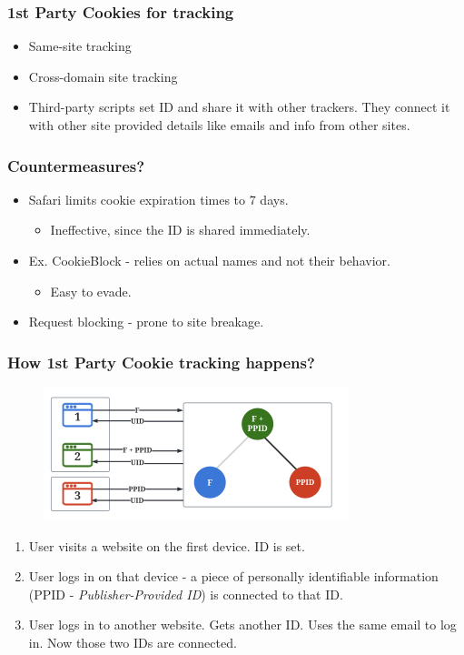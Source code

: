 \documentclass{beamer}
\begin{document}
\begin{frame}
\frametitle{1st Party Cookies for tracking}

\begin{itemize}
\item Same-site tracking
\item Cross-domain site tracking
\item Third-party scripts set ID and share it with other trackers. They connect it with other site provided details like emails and info from other sites.
\end{itemize}

\end{frame}

\begin{frame}
\frametitle{Countermeasures?}

\begin{itemize}
\item Safari limits cookie expiration times to 7 days. 
	\begin{itemize}
	\item Ineffective, since the ID is shared immediately. 
	\end{itemize}
\item Ex. CookieBlock - relies on actual names and not their behavior.
	\begin{itemize}
	\item Easy to evade.
	\end{itemize}
\item Request blocking - prone to site breakage.
\end{itemize}

\end{frame}

\begin{frame}
\frametitle{How 1st Party Cookie tracking happens?}


\begin{figure}
\includegraphics[scale=0.5]{img/crosssite}
\end{figure}

\begin{enumerate}
\item User visits a website on the first device. ID is set.
\item User logs in on that device - a piece of personally identifiable information (PPID - \textit{Publisher-Provided ID}) is connected to that ID.
\item User logs in to another website. Gets another ID. Uses the same email to log in. Now those two IDs are connected.
\end{enumerate}

\end{frame}
\end{document}

